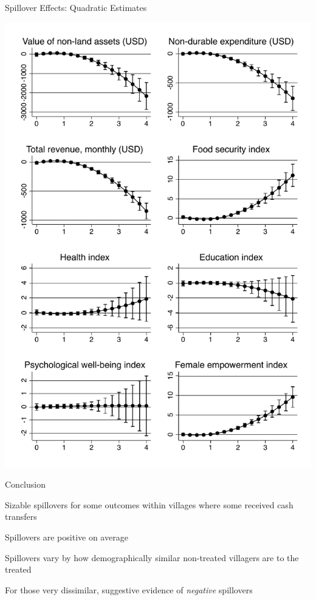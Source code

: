 \documentclass[14pt, aspectratio=169]{beamer}
\newenvironment{wideitemize}{\itemize\addtolength{\itemsep}{10pt}}{\enditemize}
\let\OLDitemize\itemize
\renewcommand\itemize{\OLDitemize\addtolength{\itemsep}{10pt}}
\begin{document}
\begin{frame}{Spillover Effects: Quadratic Estimates}
\begin{minipage}{.48\linewidth}
\end{minipage}
\hfill
\begin{minipage}{.48\linewidth}
    \includegraphics[height=0.66\textheight, trim={0 0 0 10cm}, clip]{../Figs/indices_ppp_margins.pdf}

\end{minipage}


\end{frame}

\begin{frame}{Conclusion}
\begin{wideitemize}
\item Sizable spillovers for some outcomes within villages where some received cash transfers
\item Spillovers are positive on average
\item Spillovers vary by how demographically similar non-treated villagers are to the treated
\item For those very dissimilar, suggestive evidence of \textit{negative} spillovers
\end{wideitemize}
\end{frame}
\end{document}
